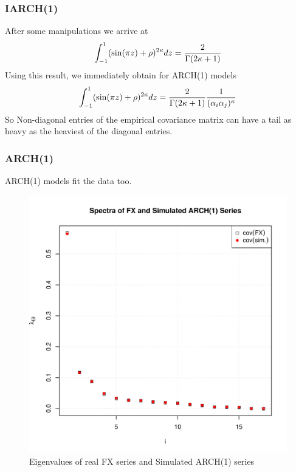 \documentclass{beamer}
\begin{document}
\begin{frame}
  \frametitle{IARCH(1)}
  After some manipulations we arrive at
  \begin{equation}
    \int_{-1}^1 (\sin(\pi z) + \rho)^{2\kappa} dz = {2 \over \Gamma(2\kappa + 1)}
  \end{equation}
  Using this result, we immediately obtain for ARCH(1) models
  \begin{equation*}
    \int_{-1}^1 (\sin(\pi z) + \rho)^{2\kappa} dz =
    {2 \over \Gamma(2\kappa + 1)}
    {1 \over (\alpha_{i} \alpha_{j})^\kappa}
  \end{equation*}
  So Non-diagonal entries of the empirical covariance matrix can have
  a tail as heavy as the heaviest of the diagonal entries.
\end{frame}


\begin{frame}
  \frametitle{ARCH(1)}  
  ARCH(1) models fit the data too.
  \begin{figure}[htb!]
    \centering
    \includegraphics[scale=0.35]{FX_ARCH_eigenvalues.pdf}
    \caption{\scriptsize Eigenvalues of real FX series and Simulated ARCH(1) series}
  \end{figure}
\end{frame}
\end{document}
